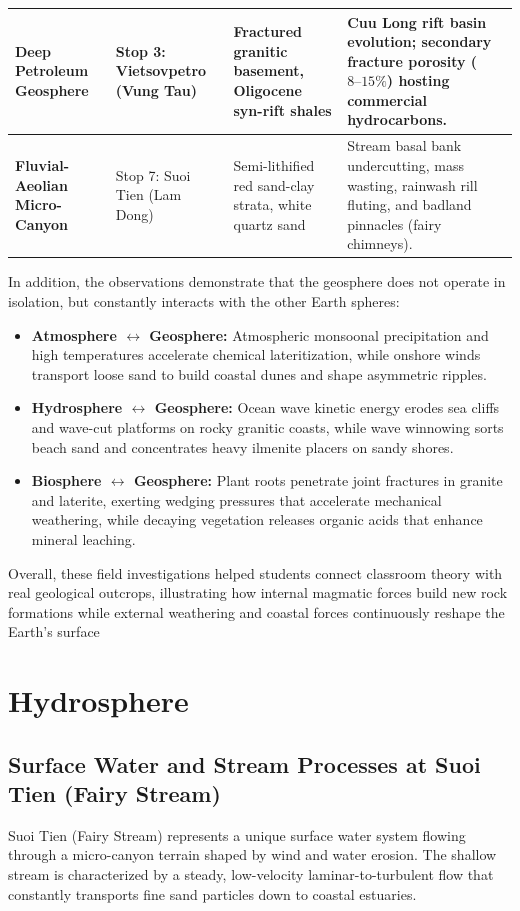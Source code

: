 \documentclass[11pt, a4paper]{article}
\begin{document}
\begin{table}[H]
\begin{tabular}{p{2.8cm} p{3.2cm} p{4.2cm} p{4.6cm}}
        \midrule
        \textbf{Deep Petroleum Geosphere} & Stop 3: Vietsovpetro \newline (Vung Tau) & Fractured granitic basement, Oligocene syn-rift shales & Cuu Long rift basin evolution; secondary fracture porosity ($8\text{--}15\%$) hosting commercial hydrocarbons. \\
        \midrule
        \textbf{Fluvial-Aeolian Micro-Canyon} & Stop 7: Suoi Tien \newline (Lam Dong) & Semi-lithified red sand-clay strata, white quartz sand & Stream basal bank undercutting, mass wasting, rainwash rill fluting, and badland pinnacles (fairy chimneys). \\
        \bottomrule
    \end{tabular}
\end{table}

In addition, the observations demonstrate that the geosphere does not operate in isolation, but constantly interacts with the other Earth spheres:
\begin{itemize}
    \item \textbf{Atmosphere $\longleftrightarrow$ Geosphere:} Atmospheric monsoonal precipitation and high temperatures accelerate chemical lateritization, while onshore winds transport loose sand to build coastal dunes and shape asymmetric ripples.
    \item \textbf{Hydrosphere $\longleftrightarrow$ Geosphere:} Ocean wave kinetic energy erodes sea cliffs and wave-cut platforms on rocky granitic coasts, while wave winnowing sorts beach sand and concentrates heavy ilmenite placers on sandy shores.
    \item \textbf{Biosphere $\longleftrightarrow$ Geosphere:} Plant roots penetrate joint fractures in granite and laterite, exerting wedging pressures that accelerate mechanical weathering, while decaying vegetation releases organic acids that enhance mineral leaching.
\end{itemize}

Overall, these field investigations helped students connect classroom theory with real geological outcrops, illustrating how internal magmatic forces build new rock formations while external weathering and coastal forces continuously reshape the Earth's surface


\section{Hydrosphere}

\subsection{Surface Water and Stream Processes at Suoi Tien (Fairy Stream)}
Suoi Tien (Fairy Stream) represents a unique surface water system flowing through a micro-canyon terrain shaped by wind and water erosion. The shallow stream is characterized by a steady, low-velocity laminar-to-turbulent flow that constantly transports fine sand particles down to coastal estuaries.
\end{document}
